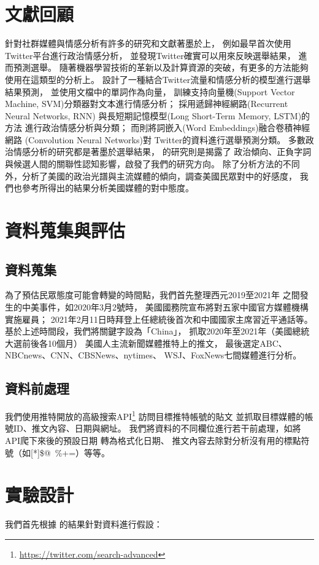 \documentclass[12pt,twocolumn,letterpaper]{article}
\begin{document}
\section{文獻回顧}\label{sec:LR}
針對社群媒體與情感分析有許多的研究和文獻著墨於上，
例如最早\cite{twt}首次使用Twitter平台進行政治情感分析，
並發現Twitter確實可以用來反映選舉結果，
進而預測選舉。
隨著機器學習技術的革新以及計算資源的突破，有更多的方法能夠使用在這類型的分析上。
\cite{svm}設計了一種結合Twitter流量和情感分析的模型進行選舉結果預測，
並使用文檔中的單詞作為向量，
訓練支持向量機(Support Vector Machine, SVM)分類器對文本進行情感分析；
\cite{RNN}採用遞歸神經網路(Recurrent Neural Networks, RNN)
與長短期記憶模型(Long Short-Term Memory, LSTM)的方法
進行政治情感分析與分類；
而\cite{embed}則將詞嵌入(Word Embeddings)融合卷積神經網路
(Convolution Neural Networks)對
Twitter的資料進行選舉預測分類。
多數政治情感分析的研究都是著墨於選舉結果，
\cite{emo}的研究則是揭露了
政治傾向、正負字詞與候選人間的關聯性認知影響，啟發了我們的研究方向。
除了分析方法的不同外，\cite{press}分析了美國的政治光譜與主流媒體的傾向，\cite{RRPFI}調查美國民眾對中的好感度，
我們也參考\cite{press, RRPFI}所得出的結果分析美國媒體的對中態度。

\section{資料蒐集與評估}\label{sec:struc}
\subsection{資料蒐集}
為了預估民眾態度可能會轉變的時間點，我們首先整理西元2019至2021年
之間發生的中美事件，如2020年3月2號時，
美國國務院宣布將對五家中國官方媒體機構實施雇員；
2021年2月11日時拜登上任總統後首次和中國國家主席習近平通話等。
基於上述時間段，我們將關鍵字設為「China」，
抓取2020年至2021年（美國總統大選前後各10個月）
美國人主流新聞媒體推特上的推文，
最後選定ABC、NBCnews、CNN、CBSNews、nytimes、
WSJ、FoxNews七間媒體進行分析。

\subsection{資料前處理}
我們使用推特開放的高級搜索API\footnote{\url{https://twitter.com/search-advanced}}
訪問目標推特帳號的貼文
並抓取目標媒體的帳號ID、推文內容、日期與網址。
我們將資料的不同欄位進行若干前處理，如將API爬下來後的預設日期
轉為格式化日期、
推文內容去除對分析沒有用的標點符號（如[*]\$@~\%+=）等等。

\section{實驗設計}\label{sec:exp}
我們首先根據\cite{RRPFI} 的結果針對資料進行假設：
\end{document}
